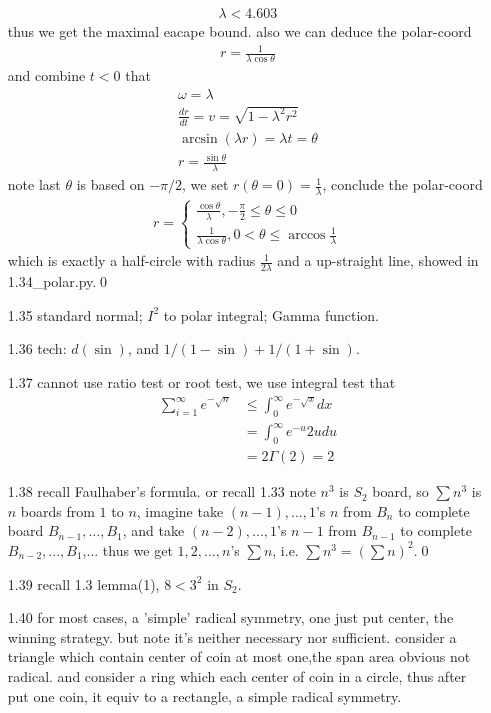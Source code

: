 \documentclass[paper=a4, fontsize=11pt]{scrartcl} %
\numberwithin{equation}{section} %
\numberwithin{figure}{section} %
\numberwithin{table}{section} %
\begin{document}
\begin{itemize}
\begin{align}
		\lambda < 4.603
	\end{align}
	thus we get the maximal eacape bound. also we can deduce the polar-coord 
	\begin{align}
		r = \frac{1}{\lambda \cos\theta}
	\end{align}
	and combine $t<0$ that
	\begin{align}
		\omega = \lambda\\
		\frac{dr}{dt} = v = \sqrt{1-\lambda^2r^2}\\
		\arcsin (\lambda r) = \lambda t = \theta \\
		r = \frac{\sin\theta}{\lambda}
	\end{align}
	note last $\theta$ is based on $-\pi/2$, we set $r(\theta=0)=\frac{1}{\lambda}$, conclude the polar-coord
	\begin{align}
		r = \begin{cases} \frac{\cos\theta}{\lambda}, -\frac{\pi}{2}\leq \theta\leq 0 \\
			\frac{1}{\lambda \cos\theta}, 0<\theta\leq \arccos \frac{1}{\lambda}\end{cases}
	\end{align}
	which is exactly a half-circle with radius $\frac{1}{2\lambda}$ and a up-straight line, showed in 1.34\_polar.py.\qed
	\item[1.35] standard normal; $I^2$ to polar integral; Gamma function.
	\item[1.36] tech: $d(\sin )$, and $1/(1-\sin) + 1/(1+\sin)$.
	\item[1.37] cannot use ratio test or root test, we use integral test that
	\begin{align}
		\sum_{i=1}^\infty e^{-\sqrt{n}} &\leq \int_0^\infty e^{-\sqrt{x}}dx\\
			&= \int_0^\infty e^{-u}2udu\\
			&= 2 \Gamma(2)=2
	\end{align}
	\item[1.38] recall Faulhaber's formula. or recall 1.33 note $n^3$ is $S_2$ board, so $\sum n^3$ is $n$ boards from $1$ to $n$, imagine take $(n-1),...,1$'s $n$ from $B_n$ to complete board $B_{n-1},...,B_1$, and take $(n-2),...,1$'s $n-1$ from $B_{n-1}$ to complete $B_{n-2},...,B_1$,... thus we get $1,2,...,n$'s $\sum n$, i.e. $\sum n^3 = (\sum n)^2$.\qed
	\item[1.39] recall 1.3 lemma(1), $8<3^2$ in $S_2$.
	\item[1.40] for most cases, a 'simple' radical symmetry, one just put center, the winning strategy. but note it's neither necessary nor sufficient. consider a triangle which contain center of coin at most one,the span area obvious not radical. and consider a ring which each center of coin in a circle, thus after put one coin, it equiv to a rectangle, a simple radical symmetry.

\end{itemize}
\end{document}
